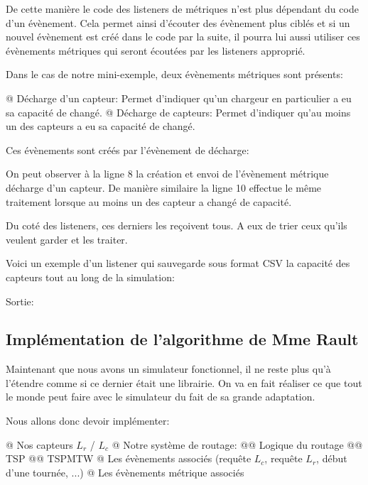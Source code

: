 \documentclass[final]{polytech/polytech}
\begin{document}
				De cette manière le code des listeners de métriques n'est plus dépendant du code d'un évènement.
				Cela permet ainsi d'écouter des évènement plus ciblés et si un nouvel évènement est créé dans le code par la suite, il pourra lui aussi utiliser ces évènements métriques qui seront écoutées par les listeners approprié.
				
				Dans le cas de notre mini-exemple, deux évènements métriques sont présents:
				\begin{easylist}
					@ Décharge d'un capteur: Permet d'indiquer qu'un chargeur en particulier a eu sa capacité de changé.
					@ Décharge de capteurs: Permet d'indiquer qu'au moins un des capteurs a eu sa capacité de changé.
				\end{easylist}
				
				Ces évènements sont créés par l'évènement de décharge:
				
				On peut observer à la ligne 8 la création et envoi de l'évènement métrique décharge d'un capteur.
				De manière similaire la ligne 10 effectue le même traitement lorsque au moins un des capteur a changé de capacité.
 
				Du coté des listeners, ces derniers les reçoivent tous.
				A eux de trier ceux qu'ils veulent garder et les traiter.
				
				Voici un exemple d'un listener qui sauvegarde sous format CSV la capacité des capteurs tout au long de la simulation:
				
				Sortie:
				
		\subsection{Implémentation de l'algorithme de Mme Rault}
			Maintenant que nous avons un simulateur fonctionnel, il ne reste plus qu'à l'étendre comme si ce dernier était une librairie.
			On va en fait réaliser ce que tout le monde peut faire avec le simulateur du fait de sa grande adaptation.
			
			Nous allons donc devoir implémenter:
			\begin{easylist}
				@ Nos capteurs $L_r$ / $L_c$
				@ Notre système de routage:
				@@ Logique du routage
				@@ TSP
				@@ TSPMTW
				@ Les évènements associés (requête $L_c$, requête $L_r$, début d'une tournée, ...)
				@ Les évènements métrique associés
			\end{easylist}
			
\end{document}
